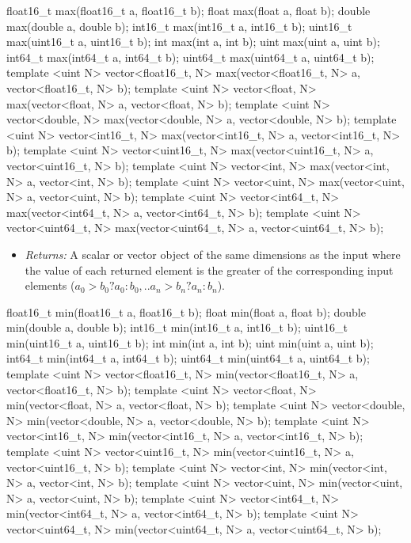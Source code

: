 \begin{HLSL}
float16_t max(float16_t a, float16_t b);
float max(float a, float b);
double max(double a, double b);
int16_t max(int16_t a, int16_t b);
uint16_t max(uint16_t a, uint16_t b);
int max(int a, int b);
uint max(uint a, uint b);
int64_t max(int64_t a, int64_t b);
uint64_t max(uint64_t a, uint64_t b);
template <uint N>
vector<float16_t, N> max(vector<float16_t, N> a, vector<float16_t, N> b);
template <uint N> vector<float, N> max(vector<float, N> a, vector<float, N> b);
template <uint N>
vector<double, N> max(vector<double, N> a, vector<double, N> b);
template <uint N>
vector<int16_t, N> max(vector<int16_t, N> a, vector<int16_t, N> b);
template <uint N>
vector<uint16_t, N> max(vector<uint16_t, N> a, vector<uint16_t, N> b);
template <uint N> vector<int, N> max(vector<int, N> a, vector<int, N> b);
template <uint N> vector<uint, N> max(vector<uint, N> a, vector<uint, N> b);
template <uint N>
vector<int64_t, N> max(vector<int64_t, N> a, vector<int64_t, N> b);
template <uint N>
vector<uint64_t, N> max(vector<uint64_t, N> a, vector<uint64_t, N> b);
\end{HLSL}

\begin{itemize}
  \item \textit{Returns:} A scalar or vector object of the same dimensions as
  the input where the value of each returned element is the greater of the
  corresponding input elements (\(a_0 > b_0 ? a_0 : b_0, .. a_n > b_n ? a_n :
  b_n\)).
\end{itemize}

\begin{HLSL}
float16_t min(float16_t a, float16_t b);
float min(float a, float b);
double min(double a, double b);
int16_t min(int16_t a, int16_t b);
uint16_t min(uint16_t a, uint16_t b);
int min(int a, int b);
uint min(uint a, uint b);
int64_t min(int64_t a, int64_t b);
uint64_t min(uint64_t a, uint64_t b);
template <uint N>
vector<float16_t, N> min(vector<float16_t, N> a, vector<float16_t, N> b);
template <uint N> vector<float, N> min(vector<float, N> a, vector<float, N> b);
template <uint N>
vector<double, N> min(vector<double, N> a, vector<double, N> b);
template <uint N>
vector<int16_t, N> min(vector<int16_t, N> a, vector<int16_t, N> b);
template <uint N>
vector<uint16_t, N> min(vector<uint16_t, N> a, vector<uint16_t, N> b);
template <uint N> vector<int, N> min(vector<int, N> a, vector<int, N> b);
template <uint N> vector<uint, N> min(vector<uint, N> a, vector<uint, N> b);
template <uint N>
vector<int64_t, N> min(vector<int64_t, N> a, vector<int64_t, N> b);
template <uint N>
vector<uint64_t, N> min(vector<uint64_t, N> a, vector<uint64_t, N> b);
\end{HLSL}

